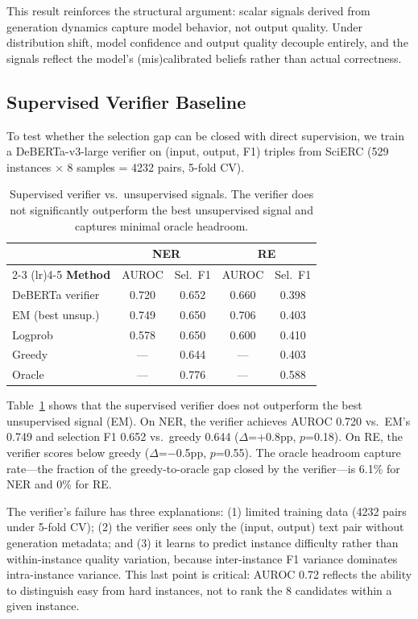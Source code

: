 \documentclass[11pt,a4paper]{article}
\begin{document}
This result reinforces the structural argument: scalar signals derived from generation dynamics capture model behavior, not output quality. Under distribution shift, model confidence and output quality decouple entirely, and the signals reflect the model's (mis)calibrated beliefs rather than actual correctness.

\subsection{Supervised Verifier Baseline}
\label{sec:verifier}

To test whether the selection gap can be closed with direct supervision, we train a DeBERTa-v3-large verifier on (input, output, F1) triples from SciERC (529 instances $\times$ 8 samples = 4232 pairs, 5-fold CV).

\begin{table}[t]
\centering
\small
\begin{tabular}{l cc cc}
\toprule
& \multicolumn{2}{c}{\textbf{NER}} & \multicolumn{2}{c}{\textbf{RE}} \\
\cmidrule(lr){2-3} \cmidrule(lr){4-5}
\textbf{Method} & AUROC & Sel.\ F1 & AUROC & Sel.\ F1 \\
\midrule
DeBERTa verifier & 0.720 & 0.652 & 0.660 & 0.398 \\
EM (best unsup.)  & 0.749 & 0.650 & 0.706 & 0.403 \\
Logprob           & 0.578 & 0.650 & 0.600 & 0.410 \\
Greedy            & --- & 0.644 & --- & 0.403 \\
Oracle            & --- & 0.776 & --- & 0.588 \\
\bottomrule
\end{tabular}
\caption{Supervised verifier vs.\ unsupervised signals. The verifier does not significantly outperform the best unsupervised signal and captures minimal oracle headroom.}
\label{tab:verifier}
\end{table}

Table~\ref{tab:verifier} shows that the supervised verifier does not outperform the best unsupervised signal (EM). On NER, the verifier achieves AUROC 0.720 vs.\ EM's 0.749 and selection F1 0.652 vs.\ greedy 0.644 ($\Delta$=+0.8pp, $p$=0.18). On RE, the verifier scores below greedy ($\Delta$=$-$0.5pp, $p$=0.55). The oracle headroom capture rate---the fraction of the greedy-to-oracle gap closed by the verifier---is 6.1\% for NER and 0\% for RE.

The verifier's failure has three explanations: (1) limited training data (4232 pairs under 5-fold CV); (2) the verifier sees only the (input, output) text pair without generation metadata; and (3) it learns to predict instance difficulty rather than within-instance quality variation, because inter-instance F1 variance dominates intra-instance variance. This last point is critical: AUROC 0.72 reflects the ability to distinguish easy from hard instances, not to rank the 8 candidates within a given instance.
\end{document}
